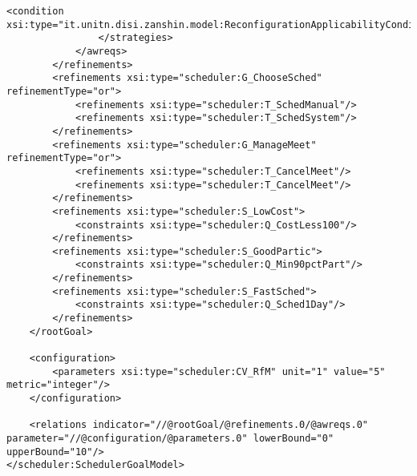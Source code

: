 \begin{lstlisting}[caption={Especifcação do Sistema Meeting Scheduler}]
					<condition xsi:type="it.unitn.disi.zanshin.model:ReconfigurationApplicabilityCondition"/>
				</strategies>
			</awreqs>
		</refinements>
		<refinements xsi:type="scheduler:G_ChooseSched" refinementType="or">
			<refinements xsi:type="scheduler:T_SchedManual"/>
			<refinements xsi:type="scheduler:T_SchedSystem"/>
		</refinements>
		<refinements xsi:type="scheduler:G_ManageMeet" refinementType="or">
			<refinements xsi:type="scheduler:T_CancelMeet"/>
			<refinements xsi:type="scheduler:T_CancelMeet"/>
		</refinements>
		<refinements xsi:type="scheduler:S_LowCost">
			<constraints xsi:type="scheduler:Q_CostLess100"/>
		</refinements>
		<refinements xsi:type="scheduler:S_GoodPartic">
			<constraints xsi:type="scheduler:Q_Min90pctPart"/>
		</refinements>
		<refinements xsi:type="scheduler:S_FastSched">
			<constraints xsi:type="scheduler:Q_Sched1Day"/>
		</refinements> 
	</rootGoal>
	
	<configuration>
		<parameters xsi:type="scheduler:CV_RfM" unit="1" value="5" metric="integer"/>
	</configuration>
	
	<relations indicator="//@rootGoal/@refinements.0/@awreqs.0" parameter="//@configuration/@parameters.0" lowerBound="0" upperBound="10"/>
</scheduler:SchedulerGoalModel>

\end{lstlisting}